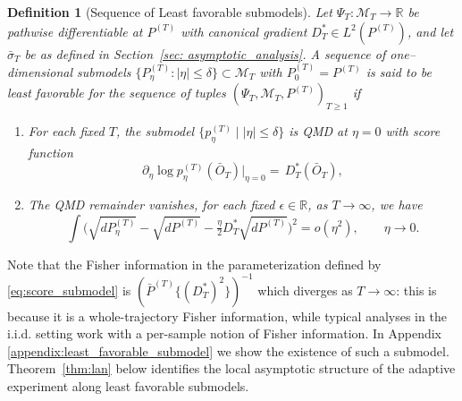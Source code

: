 \documentclass[11pt]{article}
\newtheorem{defn}{Definition}
\begin{document}
\begin{defn}[Sequence of Least favorable submodels]\label{def:lfs}
Let $\Psi_T:\mathcal M_T\to\mathbb R$ be pathwise differentiable at
$P^{(T)}$ with canonical gradient $D_T^*\in L^2(P^{(T)})$, and let $\bar{\sigma}_T$ be as defined in Section~\ref{sec: asymptotic_analysis}. A sequence of one--dimensional submodels
$\{P^{(T)}_\eta:|\eta|\le\delta\}\subset\mathcal M_T$ with
$P^{(T)}_0=P^{(T)}$ is said to be \emph{least favorable} for the sequence of tuples $(\Psi_T, \mathcal{M}_T, P^{(T)})_{T\geq 1}$ if 
\begin{enumerate}
    \item For each fixed $T$, the submodel $\{p_\eta^{(T)}\mid |\eta|\leq \delta\}$ is QMD at $\eta = 0$ with score function 
    \begin{equation}
\partial_\eta \log p^{(T)}_\eta(\bar O_T)\big|_{\eta=0}
=
\,D_T^*(\bar O_T),
\label{eq:score_submodel}
\end{equation}
    \item The QMD remainder vanishes, for each fixed $\epsilon \in \mathbb{R}$, as $T\to \infty$, we have
    \begin{equation}
    \label{eq: QMD_remainder_vanishes}
\int\!\Big(
\sqrt{dP^{(T)}_{\eta}}
-\sqrt{dP^{(T)}}
-\tfrac{\eta}{2}
D_T^*\sqrt{dP^{(T)}}
\Big)^2
=o(\eta^2),
\qquad \eta\to0.
\end{equation}
\end{enumerate}
\end{defn}

Note that the Fisher information in the parameterization defined by \eqref{eq:score_submodel} is $(\bar P^{(T)} \{(D^*_T)^2\})^{-1}$ which diverges as $T \to \infty$: this is because it is a whole-trajectory Fisher information, while typical analyses in the i.i.d. setting work with a per-sample notion of Fisher information. In  Appendix \ref{appendix:least_favorable_submodel} we show the existence of such a submodel. Theorem~\ref{thm:lan} below identifies the local asymptotic structure of the
adaptive experiment along least favorable submodels. 
\end{document}
